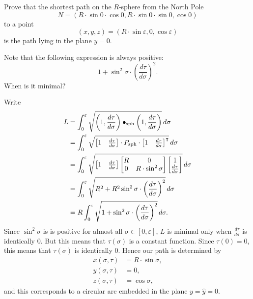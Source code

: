 \documentclass{ximera}
\begin{document}
\begin{problem}
  Prove that the shortest path on the $R$-sphere from the North Pole
  \[
  N=\left( R\cdot \sin 0\cdot  \cos 0,R\cdot \sin  0\cdot \sin 0,\cos
  0\right)
  \]
  to a point
  \[
  (x,y,z)=\left(R\cdot \sin \varepsilon,0,\cos \varepsilon\right)
  \]
  is the path lying in the plane $y=0$.
  \begin{hint}
    Note that the following expression is always positive:
    \[
    1+\sin ^{2}\sigma\cdot \left(\frac{d\tau }{d\sigma}\right)^{2}.
    \]
    When is it minimal?
  \end{hint}

  \begin{freeResponse}
    Write
    \begin{align*}
    L  &=\int_{0}^{\varepsilon} \sqrt{\left(1,\dd[\tau]{\sigma}\right)\bullet_\mathrm{sph} \left(1,\dd[\tau]{\sigma}\right)}\d\sigma\\
    &= \int_{0}^{\varepsilon} \sqrt{
      \begin{bmatrix} 1 & \dd[\tau]{\sigma}
      \end{bmatrix} \cdot P_\mathrm{sph}\cdot
      \begin{bmatrix} 1 & \dd[\tau]{\sigma}
      \end{bmatrix}^\transpose}\d\sigma \\
    &= \int_{0}^{\varepsilon} \sqrt{
      \begin{bmatrix} 1 & \dd[\tau]{\sigma}
      \end{bmatrix}
      \begin{bmatrix}
        R & 0 \\
        0 & R\cdot\sin^2 \sigma
      \end{bmatrix}
      \begin{bmatrix} 1 \\ \dd[\tau]{\sigma}
    \end{bmatrix}}\d\sigma \\
    &= \int_{0}^{\varepsilon} \sqrt{
      R^2+R^2\sin^{2}\sigma\cdot \left(\frac{d\tau }{d\sigma}\right)^{2}
    }\d\sigma \\
    &= R\int_{0}^{\varepsilon} \sqrt{
      1+\sin^{2}\sigma\cdot \left(\frac{d\tau }{d\sigma}\right)^{2}
    }\d\sigma.
    \end{align*}
   Since $\sin^{2}\sigma$ is is positive for almost all $\sigma\in[
     0,\varepsilon] $, $L$ is minimal only when
   $\frac{d\tau}{d\sigma}$ is identically $0$. But this means that
   $\tau\left( \sigma\right) $ is a constant function. Since
   $\tau\left( 0\right) =0$, this means that $\tau\left( \sigma\right)
   $ is identically $0$. Hence our path is determined by
   \begin{align*}
     x(\sigma,\tau) &=R\cdot \sin\sigma,\\
     y(\sigma,\tau) &=0,\\
     z(\sigma,\tau) &=\cos \sigma,
   \end{align*}
   and this corresponds to a circular arc embedded in the plane
   $y=\hat{y}=0$.
  \end{freeResponse}

\end{problem}
\end{document}

